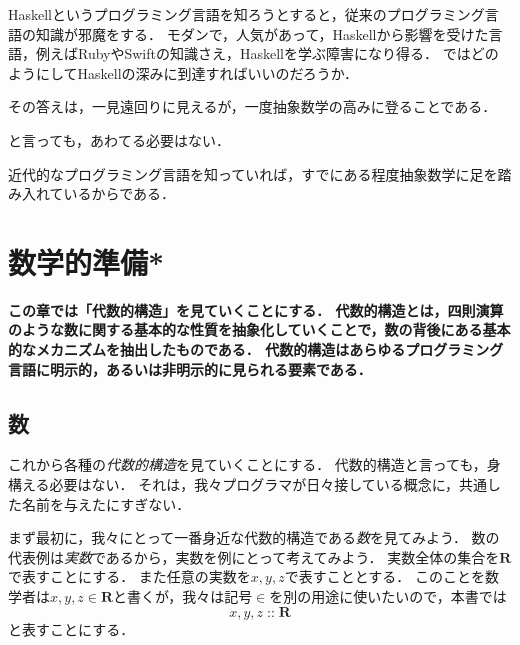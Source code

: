\documentclass[twocolumn]{jsbook}
\DeclareMathOperator{\mathIn}{::}
\newcommand{\mathSet}[1]{\mathbf{#1}}
\newcommand{\keyword}[1]{\emph{#1}}
\newenvironment{leader}{\begingroup\bf}{\endgroup}
\begin{document}
Haskellというプログラミング言語を知ろうとすると，従来のプログラミング言語の知識が邪魔をする．
モダンで，人気があって，Haskellから影響を受けた言語，例えばRubyやSwiftの知識さえ，Haskellを学ぶ障害になり得る．
ではどのようにしてHaskellの深みに到達すればいいのだろうか．

その答えは，一見遠回りに見えるが，一度抽象数学の高みに登ることである．

と言っても，あわてる必要はない．

近代的なプログラミング言語を知っていれば，すでにある程度抽象数学に足を踏み入れているからである．

\chapter{数学的準備*}

\begin{leader}
この章では「代数的構造」を見ていくことにする．
代数的構造とは，四則演算のような数に関する基本的な性質を抽象化していくことで，数の背後にある基本的なメカニズムを抽出したものである．
代数的構造はあらゆるプログラミング言語に明示的，あるいは非明示的に見られる要素である．
\end{leader}

\section{数}

これから各種の\keyword{代数的構造}を見ていくことにする．
代数的構造と言っても，身構える必要はない．
それは，我々プログラマが日々接している概念に，共通した名前を与えたにすぎない．

まず最初に，我々にとって一番身近な代数的構造である\keyword{数}を見てみよう．
数の代表例は\keyword{実数}であるから，実数を例にとって考えてみよう．
実数全体の集合を$\mathSet{R}$で表すことにする．
また任意の実数を$x,y,z$で表すこととする．
このことを数学者は$x,y,z\in\mathSet{R}$と書くが，我々は記号$\in$を別の用途に使いたいので，本書では$$x,y,z\mathIn\mathSet{R}$$と表すことにする．
\end{document}
